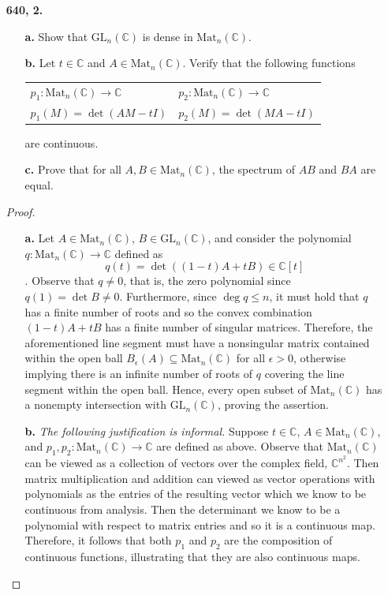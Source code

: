 \documentclass[ 12pt ]{article}
\begin{document}
\begin{enumerate}
	\item[\textbf{640, 2.}]
		\begin{enumerate}
			\item[\textbf{a.}] Show that $\mathrm{GL}_n(\mathbb{C})$ is dense in $\mathrm{Mat}_n(\mathbb{C})$.
			\item[\textbf{b.}] Let $t \in \mathbb{C}$ and $A \in \mathrm{Mat}_n(\mathbb{C})$. Verify that the following functions
				\begin{center}
				\begin{tabular}{ll}
					$p_1 : \mathrm{Mat}_n(\mathbb{C}) \to \mathbb{C}$ & $p_2 : \mathrm{Mat}_n(\mathbb{C}) \to \mathbb{C}$ \\
					$p_1(M) = \det( AM - tI )$ & $p_2(M) = \det( MA - tI )$
				\end{tabular}
				\end{center}
				are continuous.
			\item[\textbf{c.}] Prove that for all $A, B \in \mathrm{Mat}_n(\mathbb{C})$, the spectrum of $AB$ and $BA$ are equal.
		\end{enumerate}

		\begin{proof} $ $
			\begin{enumerate}
				\item[\textbf{a.}] Let $A \in \mathrm{Mat}_n(\mathbb{C})$, $B \in \mathrm{GL}_n(\mathbb{C})$, and consider the polynomial $q : \mathrm{Mat}_n(\mathbb{C}) \to \mathbb{C}$
					defined as $$q(t) = \det( (1 - t)A + tB ) \in \mathbb{C}[t]$$. Observe that $q \neq 0$, that is, the zero polynomial since $q(1) = \det B \neq 0$. Furthermore, since
					$\deg q \leq n$, it must hold that $q$ has a finite number of roots and so the convex combination $(1 - t)A + tB$ has a finite number of singular matrices. Therefore,
					the aforementioned line segment must have a nonsingular matrix contained within the open ball $B_\epsilon(A) \subseteq \mathrm{Mat}_n(\mathbb{C})$ for all $\epsilon >
					0$, otherwise implying there is an infinite number of roots of $q$ covering the line segment within the open ball. Hence, every open subset of $\mathrm{Mat}_n(
					\mathbb{C})$ has a nonempty intersection with $\mathrm{GL}_n(\mathbb{C})$, proving the assertion.

				\item[\textbf{b.}] \textit{The following justification is informal.} Suppose $t \in \mathbb{C}$, $A \in \mathrm{Mat}_n(\mathbb{C})$, and $p_1, p_2 : \mathrm{Mat}_n(
					\mathbb{C}) \to \mathbb{C}$ are defined as above. Observe that  $\mathrm{Mat}_n(\mathbb{C})$ can be viewed as a collection of vectors over the complex field,
					$\mathbb{C}^{n^2}$. Then matrix multiplication and addition can viewed as vector operations with polynomials as the entries of the resulting vector which
					we know to be continuous from analysis. Then the determinant we know to be a polynomial with respect to matrix entries and so it is a continuous map. Therefore,
					it follows that both $p_1$ and $p_2$ are the composition of continuous functions, illustrating that they are also continuous maps.


\end{enumerate}
\end{proof}
\end{enumerate}
\end{document}
